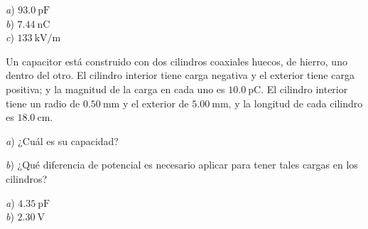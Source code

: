 \begin{Answer}
    \begin{minipage}[t]{.4\textwidth}
      \textit{a}) $\SI{93.0}{\pico\farad}$\\ \textit{b}) $\SI{7.44}{\nano\coulomb}$\\ \textit{c}) $\SI{133}{\kilo\volt/\metre}$
    \end{minipage}
\end{Answer}
%
\begin{Exercise}
  Un capacitor está construido con dos cilindros coaxiales huecos, de hierro, uno dentro del otro. El cilindro interior tiene carga negativa y el exterior tiene carga positiva; y la magnitud de la carga en cada uno es $\SI{10.0}{\pico\coulomb}$. El cilindro  interior tiene un radio de $\SI{0.50}{\milli\metre}$ y el exterior de $\SI{5.00}{\milli\metre}$, y la longitud de cada cilindro es $\SI{18.0}{\centi\metre}$.\par
  \textit{a}) ¿Cuál es su capacidad?\par
  \textit{b}) ¿Qué diferencia de potencial es necesario aplicar para tener tales cargas en los cilindros?
\end{Exercise}
\begin{Answer}
    \begin{minipage}[t]{.4\textwidth}
      \textit{a}) $\SI{4.35}{\pico\farad}$\\ \textit{b}) $\SI{2.30}{\volt}$
    \end{minipage}
\end{Answer}\par\bigskip
%

